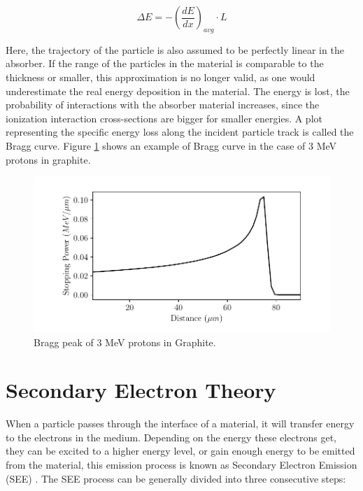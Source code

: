 \begin{equation}
    \Delta E = - \left(\frac{dE}{dx}\right)_{avg} \cdot L
    \label{eq:thinabs}
\end{equation}

Here, the trajectory of the particle is also assumed to be perfectly linear in the absorber. If the range of the particles in the material is comparable to the thickness or smaller, this approximation is no longer valid, as one would underestimate the real energy deposition in the material. The energy is lost, the probability of interactions with the absorber material increases, since the ionization interaction cross-sections are bigger for smaller energies. A plot representing the specific energy loss along the incident particle track is called the Bragg curve. Figure \ref{fig:Bragg} shows an example of Bragg curve in the case of 3 \si[]{\mega\electronvolt} protons in graphite. 

\begin{figure}[h]
    \centering
    \includegraphics[width=1.0\columnwidth]{Bragg_Graphite/Bragg.pdf}
    \caption{Bragg peak of 3 \si[]{\mega \electronvolt} protons in Graphite. }
    \label{fig:Bragg}
\end{figure}

\section{Secondary Electron Theory}
\label{sec:SEY}
When a particle passes through the interface of a material, it will transfer energy to the electrons in the medium. Depending on the energy these electrons get, they can be excited to a higher energy level, or gain enough energy to be emitted from the material, this emission
process is known as Secondary Electron Emission (SEE) \parencite*[][]{ref:see1}. The SEE process can be generally divided into three consecutive steps:

